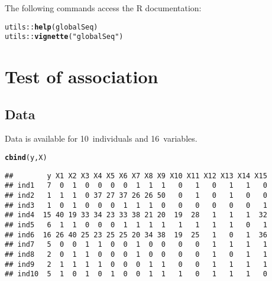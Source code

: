 \documentclass{article}\usepackage[]{graphicx}\usepackage[]{color}
\makeatletter
\newcommand{\hlstr}[1]{\textcolor[rgb]{0.192,0.494,0.8}{#1}}%
\newcommand{\hlopt}[1]{\textcolor[rgb]{0,0,0}{#1}}%
\newcommand{\hlstd}[1]{\textcolor[rgb]{0.345,0.345,0.345}{#1}}%
\newcommand{\hlkwd}[1]{\textcolor[rgb]{0.737,0.353,0.396}{\textbf{#1}}}%
\newenvironment{kframe}{%
 \def\at@end@of@kframe{}%
 \ifinner\ifhmode%
  \def\at@end@of@kframe{\end{minipage}}%
  \begin{minipage}{\columnwidth}%
 \fi\fi%
 \def\FrameCommand##1{\hskip\@totalleftmargin \hskip-\fboxsep
 \colorbox{shadecolor}{##1}\hskip-\fboxsep
     \hskip-\linewidth \hskip-\@totalleftmargin \hskip\columnwidth}%
 \MakeFramed {\advance\hsize-\width
   \@totalleftmargin\z@ \linewidth\hsize
   \@setminipage}}%
 {\par\unskip\endMakeFramed%
 \at@end@of@kframe}
\newenvironment{knitrout}{}{} %
\makeatother
\begin{document}


The following commands access the R documentation:
\begin{knitrout}
\color{fgcolor}\begin{kframe}
\begin{alltt}
\hlstd{utils}\hlopt{::}\hlkwd{help}\hlstd{(globalSeq)}
\hlstd{utils}\hlopt{::}\hlkwd{vignette}\hlstd{(}\hlstr{"globalSeq"}\hlstd{)}
\end{alltt}
\end{kframe}
\end{knitrout}

\newpage %
\section{Test of association} %
\label{TOA} %

\subsection{Data}
\label{TOA Data}

Data is available for 10~individuals and 16~variables.

\begin{knitrout}
\color{fgcolor}\begin{kframe}
\begin{alltt}
\hlkwd{cbind}\hlstd{(y,X)}
\end{alltt}
\begin{verbatim}
##        y X1 X2 X3 X4 X5 X6 X7 X8 X9 X10 X11 X12 X13 X14 X15
## ind1   7  0  1  0  0  0  0  1  1  1   0   1   0   1   1   0
## ind2   1  1  1  0 37 27 37 26 26 50   0   1   0   1   0   0
## ind3   1  0  1  0  0  0  1  1  1  0   0   0   0   0   0   1
## ind4  15 40 19 33 34 23 33 38 21 20  19  28   1   1   1  32
## ind5   6  1  1  0  0  0  1  1  1  1   1   1   1   1   0   1
## ind6  16 26 40 25 23 25 25 20 34 38  19  25   1   0   1  36
## ind7   5  0  0  1  1  0  0  1  0  0   0   0   1   1   1   1
## ind8   2  0  1  1  0  0  0  1  0  0   0   0   1   0   1   1
## ind9   2  1  1  1  1  0  0  0  1  1   0   0   1   1   1   1
## ind10  5  1  0  1  0  1  0  0  1  1   1   0   1   1   1   0
\end{verbatim}
\end{kframe}
\end{knitrout}
\end{document}
